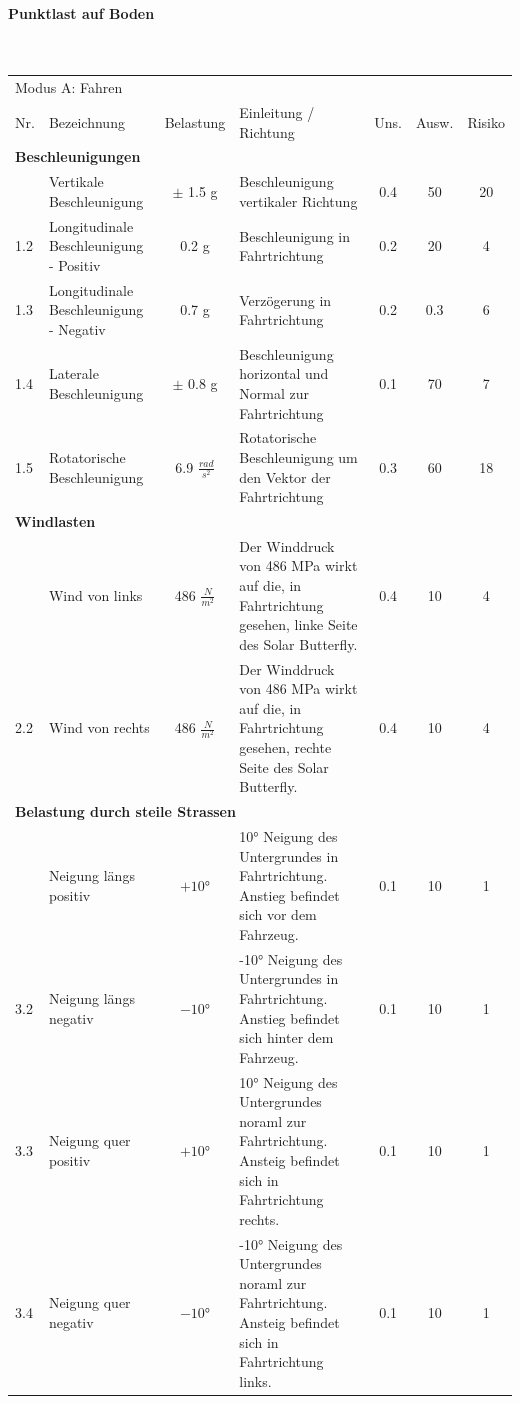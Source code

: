 \paragraph{Punktlast auf Boden}\mbox{}\\


\begin{landscape}%
  \centering %
  \begin{tabularx}{\linewidth}{llcXccc}
    \multicolumn{7}{l}{\LARGE{Modus A: Fahren}}\\
    \thickhline
    Nr. & Bezeichnung & Belastung & Einleitung / Richtung & Uns. & Ausw. & Risiko\\
    \hline
    \multicolumn{7}{l}{\textbf{Beschleunigungen}}\\
    \thickhline
    1.1 & Vertikale Beschleunigung                & $\pm$ 1.5 g & Beschleunigung vertikaler Richtung & 0.4 & 50 & 20\\
    1.2 & Longitudinale Beschleunigung - Positiv  & 0.2 g       & Beschleunigung in Fahrtrichtung & 0.2 & 20 & 4\\
    1.3 & Longitudinale Beschleunigung - Negativ  & 0.7 g       & Verzögerung in Fahrtrichtung & 0.2 & 0.3 & 6\\
    1.4 & Laterale Beschleunigung                 & $\pm$ 0.8 g & Beschleunigung horizontal und Normal zur Fahrtrichtung & 0.1 & 70 & 7\\
    1.5 & Rotatorische Beschleunigung             & 6.9 $\frac{rad}{s^2}$ & Rotatorische Beschleunigung um den Vektor der Fahrtrichtung & 0.3 & 60 & 18\\

    \multicolumn{7}{l}{\textbf{Windlasten}}\\
    \thickhline
    2.1 & Wind von links & 486 $\frac{N}{m^2}$ & Der Winddruck von 486 MPa wirkt auf die, in Fahrtrichtung gesehen, linke Seite des Solar Butterfly. & 0.4 & 10 & 4\\
    2.2 & Wind von rechts & 486 $\frac{N}{m^2}$ & Der Winddruck von 486 MPa wirkt auf die, in Fahrtrichtung gesehen, rechte Seite des Solar Butterfly. & 0.4 & 10 & 4\\

    \multicolumn{7}{l}{\textbf{Belastung durch steile Strassen}}\\
    \thickhline
    3.1	& Neigung längs positiv & $+10°$ & 10° Neigung des Untergrundes in Fahrtrichtung. Anstieg befindet sich vor dem Fahrzeug. & 0.1 & 10 & 1\\
    3.2	& Neigung längs negativ & $-10°$ & -10° Neigung des Untergrundes in Fahrtrichtung. Anstieg befindet sich hinter dem Fahrzeug. & 0.1 & 10 & 1\\
    3.3	& Neigung quer positiv  &$+10°$ & 10° Neigung des Untergrundes noraml zur Fahrtrichtung. Ansteig befindet sich in Fahrtrichtung rechts. & 0.1 & 10 & 1\\
    3.4	& Neigung quer negativ  &$-10°$ & -10° Neigung des Untergrundes noraml zur Fahrtrichtung. Ansteig befindet sich in Fahrtrichtung links. & 0.1 & 10 & 1\\


\end{tabularx}
\end{landscape}
